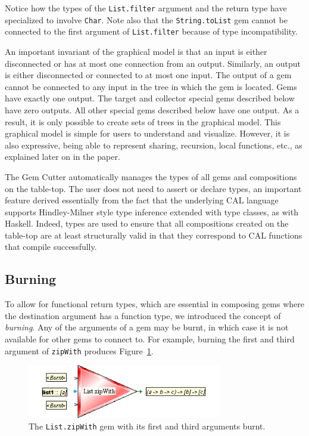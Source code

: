 \documentclass[preprint]{sigplanconf}
\begin{document}
Notice how the types of the {\tt List.filter} argument and the return
type have specialized to involve {\tt Char}. Note also that the
{\tt String.toList} gem cannot be connected to the first argument of
{\tt List.filter} because of type incompatibility.

An important invariant of the graphical model is that an input 
is either disconnected or has at most one connection from an output.
Similarly, an output is either disconnected or connected to at most one input.
The output of a gem cannot be connected to any input in the tree
in which the gem is located. Gems have exactly one output. The target and
collector special gems described below have zero outputs. All other special
gems described below have one output. As a result, it is only possible
to create sets of trees in the graphical model. This graphical model is
simple for users to understand and visualize. However, it is also expressive,
being able to represent sharing, recursion, local functions, etc.,
as explained later on in the paper.

The Gem Cutter automatically manages the types of all gems and
compositions on the table-top. The user does not need to assert or
declare types, an important feature derived essentially from the fact
that the underlying CAL language supports Hindley-Milner style type
inference extended with type classes, as with Haskell. Indeed, types
are used to ensure that all compositions created on the table-top are
at least structurally valid in that they correspond to CAL functions
that compile successfully.

\subsection{Burning}
\label{sec:burning}

To allow for functional return types, which are essential in composing
gems where the destination argument has a function type, we introduced
the concept of {\it burning}. Any of the arguments of a gem may be
burnt, in which case it is not available for other gems to connect
to. For example, burning the first and third argument of {\tt zipWith}
produces Figure~\ref{fig:zipWithBurnt}.

\begin{figure}[htb]
  \centering
  \includegraphics[width=20pc]{zipWithBurnt.png}
  \caption{The {\tt List.zipWith} gem with its first and third arguments burnt.}
  \label{fig:zipWithBurnt}
\end{figure}
\end{document}
